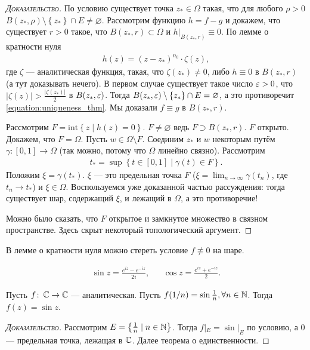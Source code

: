 \begin{proof}[\normalfont\textsc{Доказательство}]
 По условию существует точка $ z_\ast \in \Omega $ такая, что для любого $ \rho > 0 $ $ B(z_\ast,\rho) \setminus \left\{ z_\ast \right\} \cap E \neq \varnothing $. Рассмотрим функцию $ h = f - g $ и докажем, что существует $ r > 0 $ такое, что $ B(z_\ast,r) \subset \Omega $ и $ h|_{B(z_\ast,r)} \equiv 0 $. По лемме о кратности нуля
 \begin{align}
  \label{equation:uniqueness_thm}
  h(z) = (z - z_\ast)^{n_0} \cdot \zeta(z),
 \end{align} где $ \zeta $ --- аналитическая функция, такая, что $ \zeta(z_\ast) \neq 0 $, либо  $ h \equiv 0 $ в $ B(z_\ast,r) $ (а тут доказывать нечего). В первом случае существует такое число  $ \varepsilon > 0 $, что $ \left|\zeta(z) \right| > \frac{\left| \zeta(z_\ast) \right|}{2} $ в $ B(z_\ast,\varepsilon) $. Тогда $ B(z_\ast,\varepsilon) \setminus \left\{ z_\ast \right\} \cap E = \varnothing $, а это противоречит \eqref{equation:uniqueness_thm}. Мы доказали $ f \equiv g $ в $ B(z_\ast,r) $.

 Рассмотрим $ F = \mathrm{int} \left\{ z \mid h(z) = 0 \right\} $. $ F \neq \varnothing $ ведь $ F \supset B(z_\ast,r) $. $ F $ открыто. Докажем, что $ F = \Omega $. Пусть $ w \in \Omega \setminus F$. Соединим $ z_\ast $ и $ w $ некоторым путём $ \gamma\colon[0,1] \to \Omega $ (так можно, потому что $ \Omega $ линейно связно). Рассмотрим
 \begin{align*}
  t_\ast = \sup \left\{ t \in [0,1] \mid \gamma(t) \in F \right\}.
 \end{align*}  Положим $ \xi = \gamma(t_\ast) $. $ \xi $ --- это предельная точка $ F $ ($ \xi = \lim_{n \to \infty} \gamma(t_n) $, где $ t_n \to t_\ast $)  и $ \xi \in \Omega $. Воспользуемся уже доказанной частью рассуждения: тогда существует шар, содержащий $ \xi $, и лежащий в $ \Omega $, а это противоречие!

 Можно было сказать, что $ F $ открытое и замкнутое множество в связном пространстве. Здесь скрыт некоторый топологический аргумент.
\end{proof}
\begin{remrk}
 В лемме о кратности нуля можно стереть условие $ f \not\equiv 0 $ на шаре.
\end{remrk}
\begin{df}
 \begin{align*}
  \sin z = \frac{e^{iz} - e^{-iz}}{2i}, & & \cos z = \frac{e^{iz} + e^{-iz}}{2}.
 \end{align*} 
\end{df}
\begin{exmpl}
 Пусть $ f\colon\,\mathbb{C}\to\mathbb{C} $ --- аналитическая. Пусть $ f(1 / n) = \sin \frac{1}{n} , \forall n \in \mathbb{N}$. Тогда $ f(z) = \sin z $.
\end{exmpl}
\begin{proof}[\normalfont\textsc{Доказательство}]
 Рассмотрим $ E = \left\{ \frac{1}{n} \mid n \in \mathbb{N} \right\} $. Тогда $ f|_E = \sin|_E $ по условию, а $ 0 $ --- предельная точка, лежащая в $ \mathbb{C} $. Далее теорема о единственности.
\end{proof}

